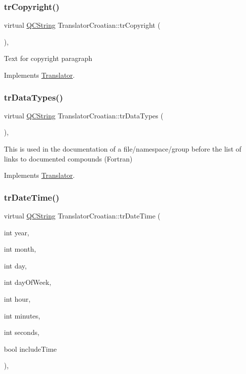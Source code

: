 \subsubsection{\texorpdfstring{trCopyright()}{trCopyright()}}
{\footnotesize\ttfamily virtual \mbox{\hyperlink{class_q_c_string}{Q\+C\+String}} Translator\+Croatian\+::tr\+Copyright (\begin{DoxyParamCaption}{ }\end{DoxyParamCaption})\hspace{0.3cm}{\ttfamily [inline]}, {\ttfamily [virtual]}}

Text for copyright paragraph 

Implements \mbox{\hyperlink{class_translator}{Translator}}.

\mbox{\label{class_translator_croatian_ae56de72f5f2b9fca50e762a1c09006c9}} 
\subsubsection{\texorpdfstring{trDataTypes()}{trDataTypes()}}
{\footnotesize\ttfamily virtual \mbox{\hyperlink{class_q_c_string}{Q\+C\+String}} Translator\+Croatian\+::tr\+Data\+Types (\begin{DoxyParamCaption}{ }\end{DoxyParamCaption})\hspace{0.3cm}{\ttfamily [inline]}, {\ttfamily [virtual]}}

This is used in the documentation of a file/namespace/group before the list of links to documented compounds (Fortran) 

Implements \mbox{\hyperlink{class_translator}{Translator}}.

\mbox{\label{class_translator_croatian_ab0b72227f89c1eacf7add3ddb4af4dc9}} 
\subsubsection{\texorpdfstring{trDateTime()}{trDateTime()}}
{\footnotesize\ttfamily virtual \mbox{\hyperlink{class_q_c_string}{Q\+C\+String}} Translator\+Croatian\+::tr\+Date\+Time (\begin{DoxyParamCaption}\item[{int}]{year,  }\item[{int}]{month,  }\item[{int}]{day,  }\item[{int}]{day\+Of\+Week,  }\item[{int}]{hour,  }\item[{int}]{minutes,  }\item[{int}]{seconds,  }\item[{bool}]{include\+Time }\end{DoxyParamCaption})\hspace{0.3cm}{\ttfamily [inline]}, {\ttfamily [virtual]}}


